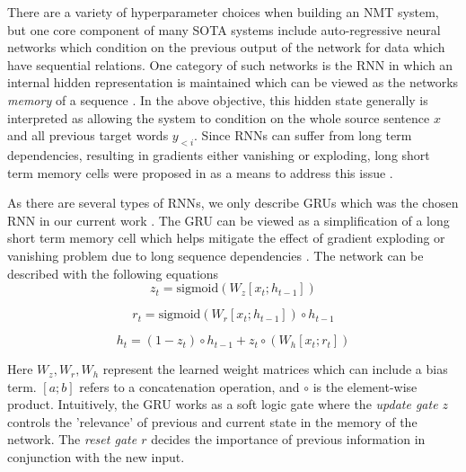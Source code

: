 There are a variety of hyperparameter choices when building an \ac{NMT} system, but one core component of many \ac{SOTA} systems include auto-regressive neural networks which condition on the previous output of the network for data which have sequential relations. One category of such networks is the \ac{RNN} in which an internal hidden representation is maintained which can be viewed as the networks \textit{memory} of a sequence \cite{gravessupervisedSequenceRNNbook2012}. In the above objective, this hidden state generally is interpreted as allowing the system to condition on the whole source sentence $x$ and all previous target words $y_{<i}$. Since \ac{RNN}s can suffer from long term dependencies, resulting in gradients either vanishing or exploding, long short term memory cells were proposed in as a means to address this issue \cite{gravessupervisedSequenceRNNbook2012}.

As there are several types of \ac{RNN}s, we only describe \ac{GRU}s which was the chosen \ac{RNN} in our current work \cite{cho2014GRU}. The \ac{GRU} can be viewed as a simplification of a long short term memory cell which helps mitigate the effect of gradient exploding or vanishing problem due to long sequence dependencies \cite{gravessupervisedSequenceRNNbook2012}. The network can be described with the following equations
\begin{equation}
	z_{t} = \text{sigmoid}(W_{z}[x_{t}; h_{t-1} ] ) %
\end{equation}

\begin{equation} 
	r_{t} = \text{sigmoid}(W_{r} [x_{t}; h_{t-1}] )  \circ h_{t-1}%
\end{equation}

\begin{equation}
	h_{t} = (1 - z_{t}) \circ h_{t-1} + z_{t} \circ (W_{h} [x_{t}; r_{t} ]) %
\end{equation}

Here $W_{z}, W_{r}, W_{h}$ represent the learned weight matrices which can include a bias term.  $[a ; b]$ refers to a concatenation operation, and $\circ$ is the element-wise product. Intuitively, the \ac{GRU} works as a soft logic gate where the \textit{update gate $z$} controls the 'relevance' of previous and current state in the memory of the network. The \textit{reset gate $r$} decides the importance of previous information in conjunction with the new input. 

